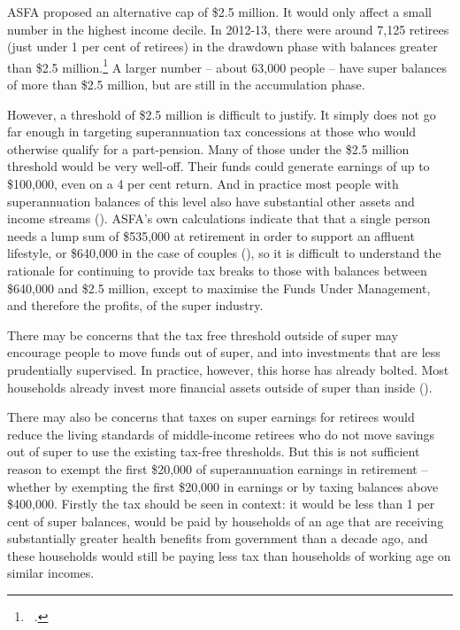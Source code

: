 \documentclass{grattanAlpha}
\begin{document}
ASFA proposed an alternative cap of \$2.5 million. It would only affect a small number in the highest income decile. In 2012-13, there were around 7,125 retirees (just under 1 per cent of retirees) in the drawdown phase with balances greater than \$2.5 million.\footnote{\gao\ \textcite{ABS2013t}.}   A larger number – about 63,000 people – have super balances of more than \$2.5 million, but are still in the accumulation phase.

However, a threshold of \$2.5 million is difficult to justify. It simply does not go far enough in targeting superannuation tax concessions at those who would otherwise qualify for a part-pension. Many of those under the \$2.5 million threshold would be very well-off. Their funds could generate earnings of up to \$100,000, even on a 4 per cent return. And in practice most people with superannuation balances of this level also have substantial other assets and income streams (). ASFA’s own calculations indicate that that a single person needs a lump sum of \$535,000 at retirement in order to support an affluent lifestyle, or \$640,000 in the case of couples (), so it is difficult to understand the rationale for continuing to provide tax breaks to those with balances between \$640,000 and \$2.5 million, except to maximise the Funds Under Management, and therefore the profits, of the super industry. 

There may be concerns that the tax free threshold outside of super may encourage people to move funds out of super, and into investments that are less prudentially supervised. In practice, however, this horse has already bolted. Most households already invest more financial assets outside of super than inside ().

There may also be concerns that taxes on super earnings for retirees would reduce the living standards of middle-income retirees who do not move savings out of super to use the existing tax-free thresholds. But this is not sufficient reason to exempt the first \$20,000 of superannuation earnings in retirement – whether by exempting the first \$20,000 in earnings or by taxing balances above \$400,000. Firstly the tax should be seen in context: it would be less than 1 per cent of super balances, would be paid by households of an age that are receiving substantially greater health benefits from government than a decade ago, and these households would still be paying less tax than households of working age on similar incomes. 
\end{document}
